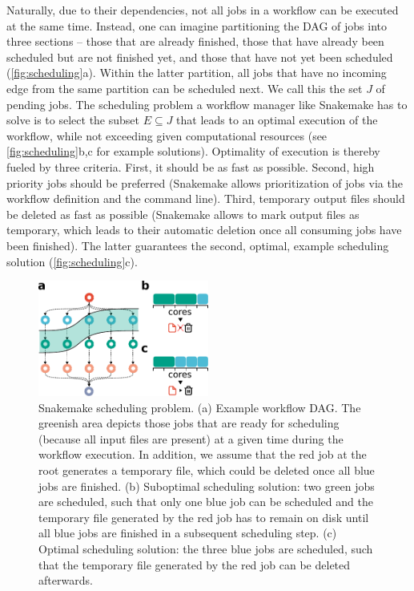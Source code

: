 \documentclass[parskip=half]{scrartcl}
\begin{document}
Naturally, due to their dependencies, not all jobs in a workflow can be executed at the same time.
Instead, one can imagine partitioning the DAG of jobs into three sections -- those that are already finished, those that have already been scheduled but are not finished yet, and those that have not yet been scheduled (\autoref{fig:scheduling}a).
Within the latter partition, all jobs that have no incoming edge from the same partition can be scheduled next.
We call this the set $J$ of pending jobs.
The scheduling problem a workflow manager like Snakemake has to solve is to select the subset $E \subseteq J$ that leads to an optimal execution of the workflow, while not exceeding given computational resources (see \autoref{fig:scheduling}b,c for example solutions).
Optimality of execution is thereby fueled by three criteria.
First, it should be as fast as possible.
Second, high priority jobs should be preferred (Snakemake allows prioritization of jobs via the workflow definition and the command line).
Third, temporary output files should be deleted as fast as possible (Snakemake allows to mark output files as temporary, which leads to their automatic deletion once all consuming jobs have been finished).
The latter guarantees the second, optimal, example scheduling solution (\autoref{fig:scheduling}c).

\begin{figure}
	\centering
	\includegraphics[width=0.5\textwidth]{scheduling.pdf}
	\caption{Snakemake scheduling problem. (a) Example workflow DAG.
		The greenish area depicts those jobs that are ready for scheduling (because all input files are present) at a given time during the workflow execution.
		In addition, we assume that the red job at the root generates a temporary file, which could be deleted once all blue jobs are finished.
		(b) Suboptimal scheduling solution: two green jobs are scheduled, such that only one blue job can be scheduled and the temporary file generated by the red job has to remain on disk until all blue jobs are finished in a subsequent scheduling step. (c) Optimal scheduling solution: the three blue jobs are scheduled, such that the temporary file generated by the red job can be deleted afterwards.}\label{fig:scheduling}
\end{figure}
\end{document}

